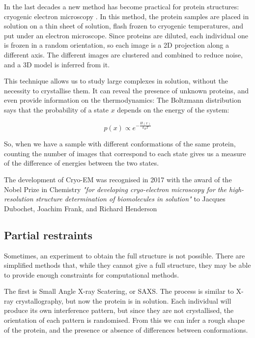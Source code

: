 In the last decades a new method has become practical for protein structures: cryogenic electron microscopy .
In this method, the protein samples are placed in solution on a thin sheet of solution, flash frozen to cryogenic temperatures, and put under an electron microscope.
Since proteins are diluted, each individual one is frozen in a random orientation, so each image is a 2D projection along a different axis.
The different images are clustered and combined to reduce noise, and a 3D model is inferred from it.

This technique allows us to study large complexes in solution, without the necessity to crystallise them.
It can reveal the presence of unknown proteins, and even provide information on the thermodynamics:
The Boltzmann distribution says that the probability of a state $x$ depends on the energy of the system:

\begin{equation*}
p(x) \propto e^{-\frac{H(x)}{k_B T}}
\end{equation*}

So, when we have a sample with different conformations of the same protein, counting the number of images that correspond to each state gives us a measure of the difference of energies between the two states.

The development of Cryo-EM was recognised in 2017 with the award of the Nobel Prize in Chemistry \emph{"for developing cryo-electron microscopy for the high-resolution structure determination of biomolecules in solution"} to Jacques Dubochet, Joachim Frank, and Richard Henderson


\subsection{Partial restraints}
Sometimes, an experiment to obtain the full structure is not possible.
There are simplified methods that, while they cannot give a full structure, they may be able to provide enough constraints for computational methods.

The first is Small Angle X-ray Scatering, or SAXS. 
The process is similar to X-ray crystallography, but now the protein is in solution.
Each individual will produce its own interference pattern, but since they are not crystallised, the orientation of each pattern is randomised.
From this we can infer a rough shape of the protein, and the presence or absence of differences between conformations.

